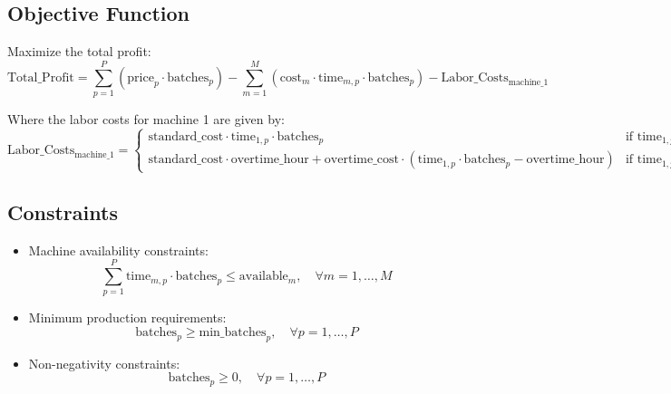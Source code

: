 \documentclass{article}
\begin{document}
\subsection*{Objective Function}
Maximize the total profit:
\[
\text{Total\_Profit} = \sum_{p=1}^{P} \left( \text{price}_{p} \cdot \text{batches}_{p} \right) - \sum_{m=1}^{M} \left( \text{cost}_{m} \cdot \text{time}_{m,p} \cdot \text{batches}_{p} \right) - \text{Labor\_Costs}_{\text{machine\_1}}
\]

Where the labor costs for machine 1 are given by:
\[
\text{Labor\_Costs}_{\text{machine\_1}} = 
\begin{cases} 
\text{standard\_cost} \cdot \text{time}_{1,p} \cdot \text{batches}_{p} & \text{if } \text{time}_{1,p} \cdot \text{batches}_{p} \leq \text{overtime\_hour} \\
\text{standard\_cost} \cdot \text{overtime\_hour} + \text{overtime\_cost} \cdot \left( \text{time}_{1,p} \cdot \text{batches}_{p} - \text{overtime\_hour} \right) & \text{if } \text{time}_{1,p} \cdot \text{batches}_{p} > \text{overtime\_hour}
\end{cases}
\]

\subsection*{Constraints}
\begin{itemize}
    \item Machine availability constraints:
    \[
    \sum_{p=1}^{P} \text{time}_{m,p} \cdot \text{batches}_{p} \leq \text{available}_{m}, \quad \forall m = 1, \ldots, M
    \]

    \item Minimum production requirements:
    \[
    \text{batches}_{p} \geq \text{min\_batches}_{p}, \quad \forall p = 1, \ldots, P
    \]

    \item Non-negativity constraints:
    \[
    \text{batches}_{p} \geq 0, \quad \forall p = 1, \ldots, P
    \]
\end{itemize}
\end{document}
